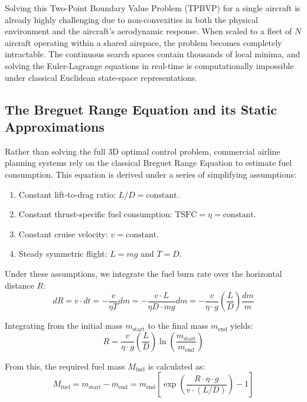 \documentclass[11pt,a4paper]{book}
\begin{document}
Solving this Two-Point Boundary Value Problem (TPBVP) for a single aircraft is already highly challenging due to non-convexities in both the physical environment and the aircraft's aerodynamic response. When scaled to a fleet of $N$ aircraft operating within a shared airspace, the problem becomes completely intractable. The continuous search spaces contain thousands of local minima, and solving the Euler-Lagrange equations in real-time is computationally impossible under classical Euclidean state-space representations.

\subsection{The Breguet Range Equation and its Static Approximations}

Rather than solving the full 3D optimal control problem, commercial airline planning systems rely on the classical Breguet Range Equation to estimate fuel consumption. This equation is derived under a series of simplifying assumptions:
\begin{enumerate}
    \item Constant lift-to-drag ratio: $L/D = \text{constant}$.
    \item Constant thrust-specific fuel consumption: $\text{TSFC} = \eta = \text{constant}$.
    \item Constant cruise velocity: $v = \text{constant}$.
    \item Steady symmetric flight: $L = mg$ and $T = D$.
\end{enumerate}

Under these assumptions, we integrate the fuel burn rate over the horizontal distance $R$:
\begin{equation}
dR = v \cdot dt = -\frac{v}{\eta T} dm = -\frac{v \cdot L}{\eta D \cdot mg} dm = -\frac{v}{\eta \cdot g} \left( \frac{L}{D} \right) \frac{dm}{m}
\end{equation}

Integrating from the initial mass $m_{\text{start}}$ to the final mass $m_{\text{end}}$ yields:
\begin{equation}
R = \frac{v}{\eta \cdot g} \left( \frac{L}{D} \right) \ln\left( \frac{m_{\text{start}}}{m_{\text{end}}} \right)
\end{equation}

From this, the required fuel mass $M_{\text{fuel}}$ is calculated as:
\begin{equation}
M_{\text{fuel}} = m_{\text{start}} - m_{\text{end}} = m_{\text{end}} \left[ \exp\left( \frac{R \cdot \eta \cdot g}{v \cdot (L/D)} \right) - 1 \right]
\end{equation}
\end{document}
